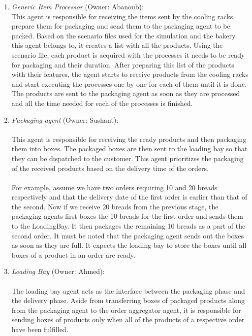 \documentclass[11pt, a4paper]{article}
\begin{document}
\begin{enumerate}
	\item \textit{Generic Item Processor} (Owner: Abanoub):\\
	This agent is responsible for receiving the items sent by the cooling racks, prepare them for packaging and send them to the packaging agent to be packed. Based on the scenario files used for the simulation and the bakery this agent belongs to, it creates a list with all the products. Using the scenario file, each product is acquired with the processes it needs to be ready for packaging and their duration. After preparing this list of the products with their features, the agent starts to receive products from the cooling racks and start executing the processes one by one for each of them until it is done. The products are sent to the packaging agent as soon as they are processed and all the time needed for each of the processes is finished.
	\item \textit{Packaging agent} (Owner: Sushant):
	\paragraph{}
	This agent is responsible for receiving the ready products and then packaging them into boxes. The packaged boxes are then sent to the loading bay so that they can be dispatched to the customer. This agent prioritizes the packaging of the received products based on the delivery time of the orders. 
	\paragraph{}
	For example, assume we have two orders requiring 10 and 20 breads respectively and that the delivery date of the first order is earlier than that of the second. Now if we receive 20 breads from the previous stage, the packaging agents first boxes the 10 breads for the first order and sends them to the LoadingBay. It then packages the remaining 10 breads as a part of the second order. It must be noted that the packaging agent sends out the boxes as soon as they are full. It expects the loading bay to store the boxes until all boxes of a product in an order are ready.
	\item \textit{Loading Bay} (Owner: Ahmed):
	\paragraph{}
	The loading bay agent acts as the interface between the packaging phase and the delivery phase. Aside from transferring boxes of packaged products along from the packaging agent to the order aggregator agent, it is responsible for sending boxes of products only when all of the products of a respective order have been fulfilled.

\end{enumerate}
\end{document}

